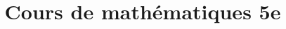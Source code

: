 \documentclass{scrbook}
\title{Cours de mathématiques 5e}
\begin{document}
\maketitle

\tableofcontents
\renewcommand{\onlyinsubfile}{}


\end{document}
